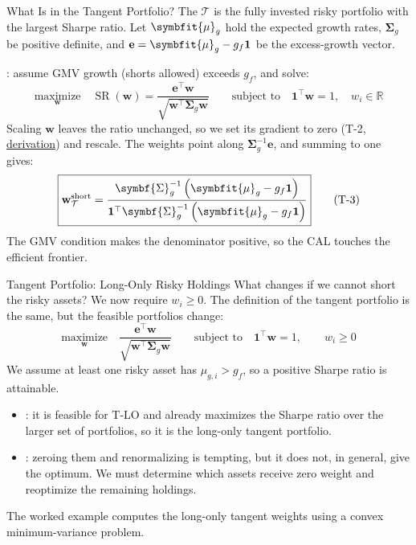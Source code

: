 \documentclass[aspectratio=169,11pt]{beamer}
\newcommand{\SR}{\operatorname{SR}}
\newcommand{\bw}{\mathbf{w}}
\newcommand{\be}{\mathbf{e}}
\newcommand{\bone}{\mathbf{1}}
\newcommand{\bmu}{\symbfit{\mu}_{g}}
\newcommand{\Sig}{\symbf{\Sigma}_{g}}
\newcommand{\Tan}{\mathcal{T}}
\newcommand{\repo}{https://github.com/varnerlab/CHEME-5660-CourseRepository-Fall-2026/blob/main/lectures/week-7/L7a}
\begin{document}
\begin{frame}{What Is in the Tangent Portfolio?}
  The  $\Tan$ is the fully invested risky portfolio with the
  largest Sharpe ratio. Let $\bmu$ hold the expected growth rates, $\Sig$ be positive
  definite, and $\be=\bmu-g_f\bone$ be the excess-growth vector.

  : assume GMV growth (shorts allowed) exceeds $g_f$, and solve:
  \[
    \underset{\bw}{\text{maximize}}\quad\SR(\bw)=\frac{\be^{\top}\bw}{\sqrt{\bw^{\top}\Sig\bw}}
    \qquad\text{subject to}\quad\bone^{\top}\bw=1,\quad w_i\in\mathbb{R}
    \tag{T-1}
  \]
  Scaling $\bw$ leaves the ratio unchanged, so we set its gradient to zero
  (T-2, \href{\repo/advanced/tangent-derivation/CHEME-5660-L7a-Derivation-Tangent-Fall-2026.ipynb}{derivation}) and rescale. The weights point along $\Sig^{-1}\be$, and summing to one gives:
  \[
    \boxed{\bw_{\Tan}^{\mathrm{short}}=\frac{\Sig^{-1}\left(\bmu-g_f\bone\right)}
      {\bone^{\top}\Sig^{-1}\left(\bmu-g_f\bone\right)}}
    \tag{T-3}
  \]
  The GMV condition makes the denominator positive, so the CAL touches the efficient frontier.
\end{frame}

\begin{frame}{Tangent Portfolio: Long-Only Risky Holdings}
  What changes if we cannot short the risky assets? We now require $w_i\ge0$. The
  definition of the tangent portfolio is the same, but the feasible portfolios change:
  \[
    \underset{\bw}{\text{maximize}}\quad\frac{\be^{\top}\bw}{\sqrt{\bw^{\top}\Sig\bw}}
    \qquad\text{subject to}\quad\bone^{\top}\bw=1,\qquad w_i\ge0
    \tag{T-LO}
  \]
  We assume at least one risky asset has $\mu_{g,i}>g_f$, so a positive Sharpe ratio
  is attainable.
  \begin{itemize}\setlength{\itemsep}{0.3em}
    \item {}: it is feasible for T-LO and already
      maximizes the Sharpe ratio over the larger set of portfolios, so it is the
      long-only tangent portfolio.
    \item {}: zeroing them and renormalizing is
      tempting, but it does not, in general, give the optimum. We must determine
      which assets receive zero weight and reoptimize the remaining holdings.
  \end{itemize}
  The worked example computes the long-only tangent weights using a convex
  minimum-variance problem.
\end{frame}
\end{document}
